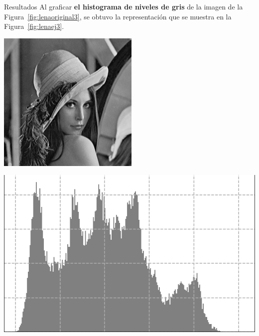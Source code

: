 \documentclass{beamer}
\begin{document}
\begin{frame}[fragile]{Resultados}
	\justifying
    Al graficar \textcolor{unahurverde}{\textbf{el histograma de niveles de gris}} de la imagen de la Figura~\ref{fig:lenaoriginal3}, 
    se obtuvo la representación que se muestra en la Figura~\ref{fig:lenaej3}.
	\vspace{0.5cm}
	
	\centering
	\begin{minipage}{0.45\linewidth}
		\centering
		\includegraphics[width=\linewidth]{../results/lena_original}
		\label{fig:lenaoriginal3}
	\end{minipage}\hfill
	\begin{minipage}{0.45\linewidth}
		\centering
		\includegraphics[width=\linewidth]{../results/lena_hist_gris}
		\label{fig:lenaej3}
	\end{minipage}
\end{frame}
\end{document}
